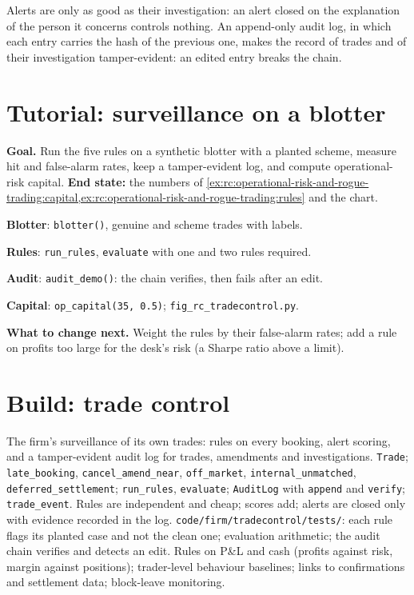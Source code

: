 Alerts are only as good as their investigation: an alert closed on the explanation of the person it
concerns controls nothing. An append-only audit log, in which each entry carries the hash of the previous one,
makes the record of trades and of their investigation tamper-evident: an edited entry breaks the chain.

\section{Tutorial: surveillance on a blotter}\label{tut:rc:operational-risk-and-rogue-trading:tutorial}

\begin{tutorial}
\textbf{Goal.} Run the five rules on a synthetic blotter with a planted scheme, measure hit and false-alarm
rates, keep a tamper-evident log, and compute operational-risk capital. \textbf{End state:} the numbers of
\cref{ex:rc:operational-risk-and-rogue-trading:capital,ex:rc:operational-risk-and-rogue-trading:rules}
and the chart.
\begin{tutsteps}
\item \textbf{Blotter}: \texttt{blotter()}, genuine and scheme trades with labels.
\item \textbf{Rules}: \texttt{run\_rules}, \texttt{evaluate} with one and two rules required.
\item \textbf{Audit}: \texttt{audit\_demo()}: the chain verifies, then fails after an edit.
\item \textbf{Capital}: \texttt{op\_capital(35, 0.5)}; \texttt{fig\_rc\_tradecontrol.py}.
\end{tutsteps}
\textbf{What to change next.} Weight the rules by their false-alarm rates; add a rule on profits too
large for the desk's risk (a Sharpe ratio above a limit).
\end{tutorial}

\section{Build: trade control}\label{bld:rc:operational-risk-and-rogue-trading:tradecontrol}

\begin{build}
 The firm's surveillance of its own trades: rules on every booking, alert scoring, and a
tamper-evident audit log for trades, amendments and investigations.
 \texttt{Trade}; \texttt{late\_booking}, \texttt{cancel\_amend\_near}, \texttt{off\_market},
\texttt{internal\_unmatched}, \texttt{deferred\_settlement}; \texttt{run\_rules}, \texttt{evaluate};
\texttt{AuditLog} with \texttt{append} and \texttt{verify}; \texttt{trade\_event}.
 Rules are independent and cheap; scores add; alerts are closed only with evidence recorded
in the log.
 \texttt{code/firm/tradecontrol/tests/}: each rule flags its planted case and not
the clean one; evaluation arithmetic; the audit chain verifies and detects an edit.
 Rules on P\&L and cash (profits against risk, margin against positions); trader-level
behaviour baselines; links to confirmations and settlement data; block-leave monitoring.
\end{build}

